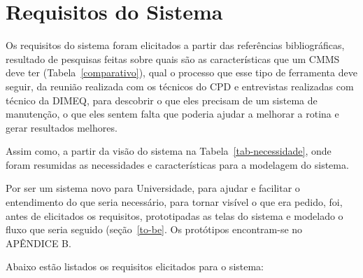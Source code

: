 
\section{Requisitos do Sistema}

Os requisitos do sistema foram elicitados a partir das referências bibliográficas, resultado de pesquisas feitas sobre quais são as características que um CMMS deve ter (Tabela~\ref{comparativo}), qual o processo que esse tipo de ferramenta deve seguir, da reunião realizada com os técnicos do CPD e entrevistas realizadas com técnico da DIMEQ, para descobrir o que eles precisam de um sistema de manutenção, o que eles sentem falta que poderia ajudar a melhorar a rotina e gerar resultados melhores.

Assim como, a partir da visão do sistema na Tabela~\ref{tab-necessidade}, onde foram resumidas as necessidades e características para a modelagem do sistema. 

Por ser um sistema novo para Universidade, para ajudar e facilitar o entendimento do que seria necessário, para tornar visível o que era pedido, foi, antes de elicitados os requisitos, prototipadas as telas do sistema e modelado o fluxo que seria seguido (seção~\ref{to-be}. Os protótipos encontram-se no APÊNDICE B.

Abaixo estão listados os requisitos elicitados para o sistema:

